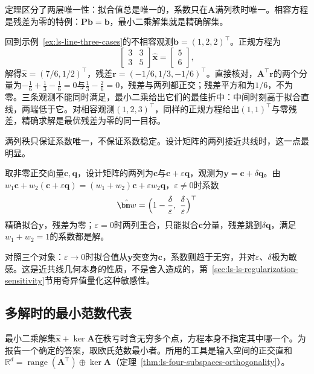 定理区分了两层唯一性：拟合值总是唯一的，系数只在$\bm A$满列秩时唯一。相容方程是残差为零的特例：$\bm P\bm b=\bm b$，最小二乘解集就是精确解集。

\begin{example}[三条不相容观测的最佳折中]
\label{ex:ls-line-least-squares}
回到示例~\ref{ex:ls-line-three-cases}的不相容观测$\bm b=(1,2,2)^\top$。正规方程为
\[
 \begin{bmatrix}3&3\\3&5\end{bmatrix}\hat{\bm x}=\begin{bmatrix}5\\6\end{bmatrix},
\]
解得$\hat{\bm x}=(7/6,1/2)^\top$，残差$\bm r=(-1/6,1/3,-1/6)^\top$。直接核对，$\bm A^\top\bm r$的两个分量为$-\frac16+\frac13-\frac16=0$与$\frac13-\frac26=0$，残差与两列都正交；残差平方和为$1/6$，不为零。三条观测不能同时满足，最小二乘给出它们的最佳折中：中间时刻高于拟合直线，两端低于它。对相容观测$(1,2,3)^\top$，同样的正规方程给出$(1,1)^\top$与零残差，精确求解是最优残差为零的同一目标。
\end{example}

满列秩只保证系数唯一，不保证系数稳定。设计矩阵的两列接近共线时，这一点最明显。

\begin{example}[近共线设计]
\label{ex:ls-nearly-collinear-design}
取非零正交向量$\bm c,\bm q$，设计矩阵的两列为$\bm c$与$\bm c+\varepsilon\bm q$，观测为$\bm y=\bm c+\delta\bm q$。由$w_1\bm c+w_2(\bm c+\varepsilon\bm q)=(w_1+w_2)\bm c+\varepsilon w_2\bm q$，$\varepsilon\neq0$时系数
\[
 \hat{\bm w}=\Bigl(1-\frac{\delta}{\varepsilon},\ \frac{\delta}{\varepsilon}\Bigr)^\top
\]
精确拟合$\bm y$，残差为零；$\varepsilon=0$时两列重合，只能拟合$\bm c$分量，残差跳到$\delta\bm q$，满足$w_1+w_2=1$的系数都是解。
\end{example}

对照三个对象：$\varepsilon\to0$时拟合值从$\bm y$突变为$\bm c$，系数则趋于无穷，并对$\varepsilon$、$\delta$极为敏感。这是近共线几何本身的性质，不是舍入造成的，第~\ref{sec:ls-ls-regularization-sensitivity}节用奇异值量化这种敏感性。

\subsection{多解时的最小范数代表}
\label{sec:ls-select-among-solutions}

最小二乘解集$\hat{\bm x}+\ker\bm A$在秩亏时含无穷多个点，方程本身不指定其中哪一个。为报告一个确定的答案，取欧氏范数最小者。所用的工具是输入空间的正交直和$\mathbb R^d=\operatorname{range}(\bm A^\top)\oplus\ker\bm A$（定理~\ref{thm:ls-four-subspaces-orthogonality}）。

